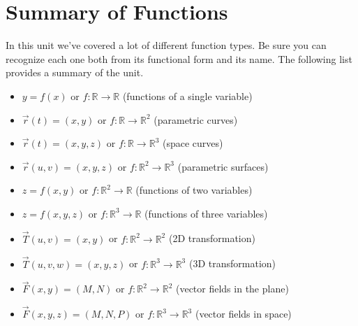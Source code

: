 \documentclass[10pt,]{book}
\theoremstyle{plain}
\theoremstyle{definition}
\theoremstyle{definition}
\theoremstyle{definition}
\theoremstyle{definition}
\theoremstyle{definition}
\numberwithin{equation}{section}
\begin{document}
\section[{Summary of Functions}]{Summary of Functions}\label{ch06_06_functionlist}
In this unit we've covered a lot of different function types. Be sure you can recognize each one both from its functional form and its name. The following list provides a summary of the unit. \leavevmode%
\begin{itemize}[label=\textbullet]
\item{}\(y=f(x)\) or \(f\colon \mathbb{R}\to\mathbb{R}\) (functions of a single variable)%
\item{}\(\vec r(t)=(x,y)\) or \(f\colon \mathbb{R}\to\mathbb{R}^2\) (parametric curves)%
\item{}\(\vec r(t)=(x,y,z)\) or \(f\colon \mathbb{R}\to\mathbb{R}^3\) (space curves)%
\item{}\(\vec r(u,v)=(x,y,z)\) or \(f\colon \mathbb{R}^2\to\mathbb{R}^3\) (parametric surfaces)%
\item{}\(z=f(x,y)\) or \(f\colon \mathbb{R}^2\to\mathbb{R}\) (functions of two variables)%
\item{}\(z=f(x,y,z)\) or \(f\colon \mathbb{R}^3\to\mathbb{R}\) (functions of three variables)%
\item{}\(\vec T(u,v)=(x,y)\) or \(f\colon \mathbb{R}^2\to\mathbb{R}^2\) (2D transformation)%
\item{}\(\vec T(u,v,w)=(x,y,z)\) or \(f\colon \mathbb{R}^3\to\mathbb{R}^3\) (3D transformation)%
\item{}\(\vec F(x,y)=(M,N)\) or \(f\colon \mathbb{R}^2\to\mathbb{R}^2\) (vector fields in the plane)%
\item{}\(\vec F(x,y,z)=(M,N,P)\) or \(f\colon \mathbb{R}^3\to\mathbb{R}^3\) (vector fields in space)%
\end{itemize}
%
\end{document}
